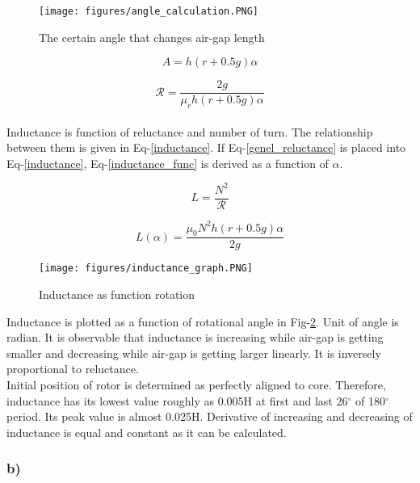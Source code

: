 \documentclass[11pt, a4paper]{article}
\begin{document}
\begin{figure}[ht]
\centering
\texttt{[image: figures/angle\_calculation.PNG]}
\caption{The certain angle that changes air-gap length } \label{aci_hesabi}
\end{figure}

\begin{equation}
\label{cross_section}
A=h(r+0.5g)\alpha
\end{equation}

\begin{equation}
\label{genel_reluctance}
\mathcal{R}=\frac{2g}{\mu_r  h (r+0.5g) \alpha}
\end{equation} \\

Inductance is function of reluctance and number of turn. The relationship between them is given in Eq-\ref{inductance}. If Eq-\ref{genel_reluctance} is placed into Eq-\ref{inductance}, Eq-\ref{inductance_func} is derived as a function of $\alpha$. 

\begin{equation}
\label{inductance}
L=\frac{N^2}{\mathcal{R}}
\end{equation} 

\begin{equation}
\label{inductance_func}
L(\alpha)=\frac{\mu_0 N^2 h (r+0.5g) \alpha}{2g}
\end{equation}

\begin{figure}[ht]
\centering
\texttt{[image: figures/inductance\_graph.PNG]}
\caption{Inductance as function rotation } \label{inductance_graph}
\end{figure}

Inductance is plotted as a function of rotational angle in Fig-\ref{inductance_graph}. Unit of angle is radian. It is observable that inductance is increasing while air-gap is getting smaller and decreasing while air-gap is getting larger linearly. It is inversely proportional to reluctance.\\

Initial position of rotor is determined as perfectly aligned to core. Therefore, inductance has its lowest value roughly as 0.005H at first and last 26$^\circ$ of 180$^\circ$ period. Its peak value is almost 0.025H. Derivative of increasing and decreasing of inductance is equal and constant as it can be calculated.

\subsubsection*{b)}
\end{document}
